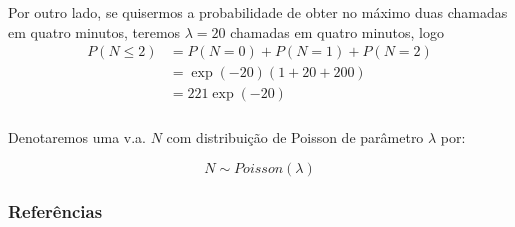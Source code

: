 \documentclass[14pt,aspectratio=1610]{beamer}
\begin{document}
\begin{frame}{}
\frametitle{}
\begin{block}{}
\justifying
Por outro lado, se quisermos a probabilidade de obter no máximo duas chamadas
em quatro minutos, teremos $\lambda=20$ chamadas em quatro minutos, logo
\begin{align*}
P(N\leq 2)&=P(N=0)+P(N=1)+P(N=2)\\
&=\exp{(-20)}(1+20+200)\\
&=221\exp{(-20)}
\end{align*}

\end{block}
\end{frame}

\begin{frame}{}
\frametitle{}
\begin{block}{}
\justifying
Denotaremos uma v.a. $N$ com distribuição de Poisson de parâmetro $\lambda$ por:

$$N\sim Poisson(\lambda)$$
\end{block}
\nocite{roteiro}
\nocite{Morettin09, Apostila, eric, montgomery2016, meyer1982probabilidade, Bastos2025}
\end{frame}

\begin{frame}[allowframebreaks]
\frametitle{\bf Referências}
\printbibliography
\end{frame}
\end{document}
